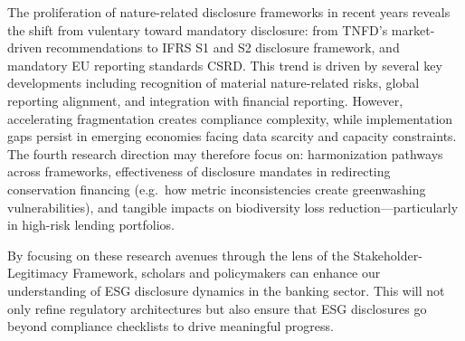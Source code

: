 \documentclass[
  authoryear]{elsarticle}
\begin{document}
The proliferation of nature-related disclosure frameworks in recent
years reveals the shift from vulentary toward mandatory disclosure: from
TNFD's market-driven recommendations to IFRS S1 and S2 disclosure
framework, and mandatory EU reporting standards CSRD. This trend is
driven by several key developments including recognition of material
nature-related risks, global reporting alignment, and integration with
financial reporting. However, accelerating fragmentation creates
compliance complexity, while implementation gaps persist in emerging
economies facing data scarcity and capacity constraints. The fourth
research direction may therefore focus on: harmonization pathways across
frameworks, effectiveness of disclosure mandates in redirecting
conservation financing (e.g.~how metric inconsistencies create
greenwashing vulnerabilities), and tangible impacts on biodiversity loss
reduction---particularly in high-risk lending portfolios.\hspace{0pt}

By focusing on these research avenues through the lens of the
Stakeholder-Legitimacy Framework, scholars and policymakers can enhance
our understanding of ESG disclosure dynamics in the banking sector. This
will not only refine regulatory architectures but also ensure that ESG
disclosures go beyond compliance checklists to drive meaningful
progress.


\renewcommand\refname{Reference}
  
\end{document}
